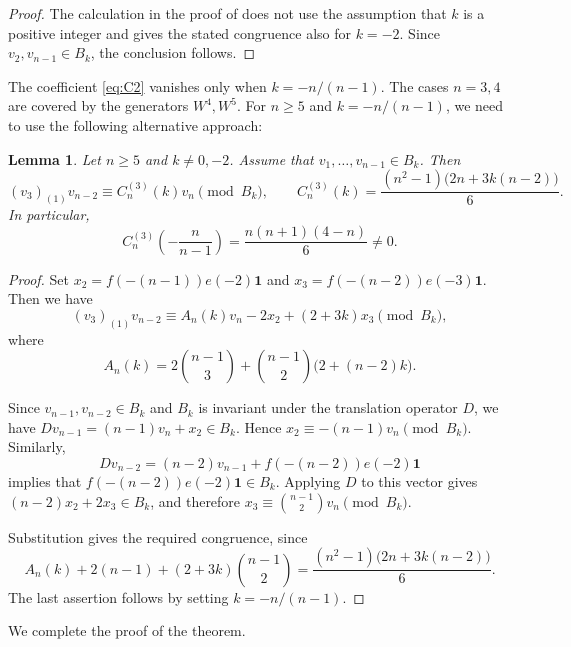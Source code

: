 \documentclass[11 pt]{amsart}
\newtheorem{lemma}{Lemma}
\theoremstyle{definition}
\theoremstyle{plain}
\begin{document}
\begin{proof}
The calculation in the proof of \cite[Theorem~2.1]{DLWY} does not use
the assumption that $k$ is a positive integer and gives the stated
congruence also for $k=-2$. Since $v_2,v_{n-1}\in B_k$, the conclusion
follows.
\end{proof}

The coefficient \eqref{eq:C2} vanishes only when
$k=-n/(n-1)$.
The cases $n=3,4$ are covered by the generators $W^4,W^5$.  For $n\geq5$
and $k=-n/(n-1)$, we need to  use the following alternative approach:

\begin{lemma}\label{lem:repair}
Let $n\geq 5$ and $k\neq 0,-2$. Assume that
$v_1,\ldots,v_{n-1}\in B_k$. Then
\[
 (v_3)_{(1)}v_{n-2}\equiv C_n^{(3)}(k)v_n\pmod{B_k},
 \qquad
 C_n^{(3)}(k)
 =\frac{(n^2-1)\bigl(2n+3k(n-2)\bigr)}{6}.
\]
In particular,
\[
 C_n^{(3)}\left(-\frac{n}{n-1}\right)
 =\frac{n(n+1)(4-n)}{6}\neq 0.
\]
\end{lemma}

\begin{proof}
Set $x_2=f(-(n-1))e(-2)\mathbf1$ and
$x_3=f(-(n-2))e(-3)\mathbf1$. Then we have
\[
 (v_3)_{(1)}v_{n-2}
 \equiv A_n(k)v_n-2x_2+(2+3k)x_3\pmod{B_k},
\]
where
\[
 A_n(k)=2\binom{n-1}{3}
 +\binom{n-1}{2}\bigl(2+(n-2)k\bigr).
\]

Since $v_{n-1},v_{n-2}\in B_k$ and $B_k$ is invariant under the
translation operator $D$, we have
$Dv_{n-1}=(n-1)v_n+x_2\in B_k$. Hence
$x_2\equiv-(n-1)v_n\pmod{B_k}$. Similarly,
\[
 Dv_{n-2}=(n-2)v_{n-1}+f(-(n-2))e(-2)\mathbf1
\]
implies that $f(-(n-2))e(-2)\mathbf1\in B_k$. Applying $D$ to this
vector gives $(n-2)x_2+2x_3\in B_k$, and therefore
$x_3\equiv\binom{n-1}{2}v_n\pmod{B_k}$.

Substitution gives the required congruence, since
\[
 A_n(k)+2(n-1)+(2+3k)\binom{n-1}{2}
 =\frac{(n^2-1)\bigl(2n+3k(n-2)\bigr)}{6}.
\]
The last assertion follows by setting $k=-n/(n-1)$.
\end{proof}


We complete the proof of the theorem.
\end{document}
